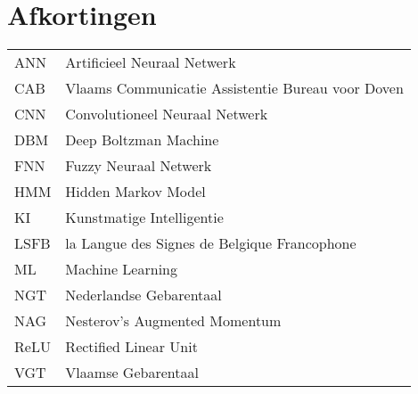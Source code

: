 \chapter{Afkortingen}

\renewcommand{\baselinestretch}{1.5}
\small\normalsize
\begin{longtable}{ll}
	ANN & Artificieel Neuraal Netwerk \\
	CAB & Vlaams Communicatie Assistentie Bureau voor Doven \\
	CNN & Convolutioneel Neuraal Netwerk \\
	DBM & Deep Boltzman Machine \\
	FNN & Fuzzy Neuraal Netwerk \\
	HMM & Hidden Markov Model \\
	KI & Kunstmatige Intelligentie\\
	LSFB & la Langue des Signes de Belgique Francophone \\
	ML & Machine Learning \\
	NGT & Nederlandse Gebarentaal \\
	NAG & Nesterov's Augmented Momentum \\
	ReLU & Rectified Linear Unit\\
	VGT & Vlaamse Gebarentaal \\	
	
	
	
	
\end{longtable}
